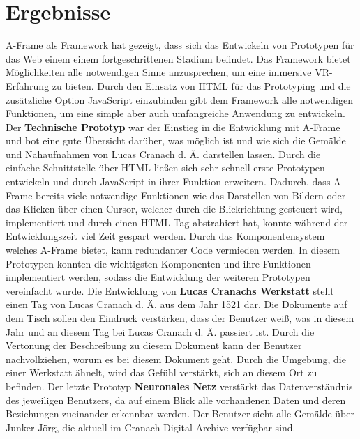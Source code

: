 \documentclass[a4paper,12pt,oneside]{article}
\begin{document}
  \section{Ergebnisse}
    A-Frame als Framework hat gezeigt, dass sich das Entwickeln von Prototypen
    für das Web einem einem fortgeschrittenen Stadium befindet. Das Framework
    bietet Möglichkeiten alle notwendigen Sinne anzusprechen, um eine
    immersive VR-Erfahrung zu bieten. Durch den Einsatz von HTML für das
    Prototyping und die zusätzliche Option JavaScript einzubinden gibt 
    dem Framework alle notwendigen Funktionen, um eine simple aber auch
    umfangreiche Anwendung zu entwickeln. \\
    Der \textbf{Technische Prototyp} war der Einstieg in die Entwicklung
    mit A-Frame und bot eine gute Übersicht darüber, was möglich ist und
    wie sich die Gemälde und Nahaufnahmen von Lucas Cranach d. Ä. darstellen
    lassen. Durch die einfache Schnittstelle über HTML ließen sich sehr
    schnell erste Prototypen entwickeln und durch JavaScript in ihrer
    Funktion erweitern. Dadurch, dass A-Frame bereits viele notwendige
    Funktionen wie das Darstellen von Bildern oder das Klicken über 
    einen Cursor, welcher durch die Blickrichtung gesteuert wird, 
    implementiert und durch einen HTML-Tag abstrahiert hat, konnte während
    der Entwicklungszeit viel Zeit gespart werden. Durch das 
    Komponentensystem welches A-Frame bietet, kann redundanter Code
    vermieden werden. In diesem Prototypen konnten die wichtigsten
    Komponenten und ihre Funktionen implementiert werden, sodass die
    Entwicklung der weiteren Prototypen vereinfacht wurde.
    Die Entwicklung von \textbf{Lucas Cranachs Werkstatt} stellt einen Tag
    von Lucas Cranach d. Ä. aus dem Jahr 1521 dar. Die Dokumente auf dem
    Tisch sollen den Eindruck verstärken, dass der Benutzer weiß, was in 
    diesem Jahr und an diesem Tag bei Lucas Cranach d. Ä. passiert ist. 
    Durch die Vertonung der Beschreibung zu diesem Dokument 
    kann der Benutzer nachvollziehen, worum es bei diesem Dokument geht.
    Durch die Umgebung, die einer Werkstatt ähnelt, wird das Gefühl verstärkt,
    sich an diesem Ort zu befinden.
    Der letzte Prototyp \textbf{Neuronales Netz} verstärkt das Datenverständnis
    des jeweiligen Benutzers, da auf einem Blick alle vorhandenen Daten und
    deren Beziehungen zueinander erkennbar werden. Der Benutzer sieht alle
    Gemälde über Junker Jörg, die aktuell im Cranach Digital Archive verfügbar
    sind.
\end{document}
